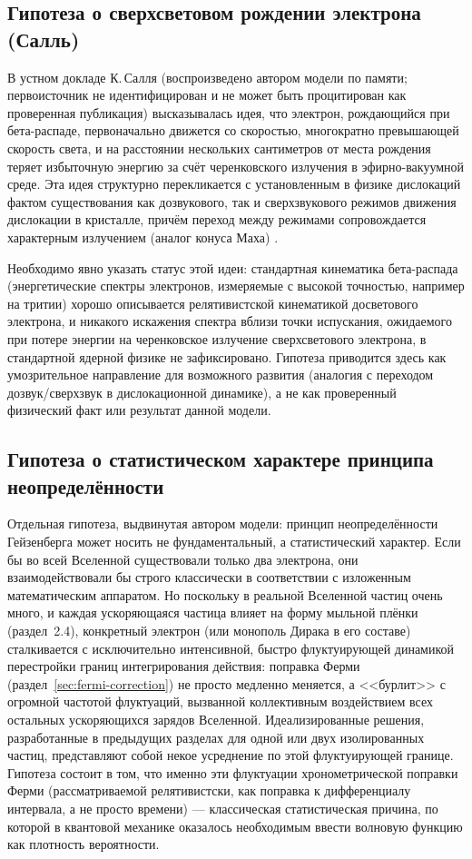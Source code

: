 \documentclass[12pt,a4paper]{article}
\begin{document}
\subsection{Гипотеза о сверхсветовом рождении электрона (Салль)}

В устном докладе К.\,Салля (воспроизведено автором модели по памяти;
первоисточник не идентифицирован и не может быть процитирован как
проверенная публикация) высказывалась идея, что электрон, рождающийся
при бета-распаде, первоначально движется со скоростью, многократно
превышающей скорость света, и на расстоянии нескольких сантиметров от
места рождения теряет избыточную энергию за счёт черенковского излучения
в эфирно-вакуумной среде. Эта идея структурно перекликается с
установленным в физике дислокаций фактом существования как дозвукового,
так и сверхзвукового режимов движения дислокации в кристалле, причём
переход между режимами сопровождается характерным излучением
(аналог конуса Маха) \cite{Lazar2010}.

Необходимо явно указать статус этой идеи: стандартная кинематика
бета-распада (энергетические спектры электронов, измеряемые с высокой
точностью, например на тритии) хорошо описывается релятивистской
кинематикой досветового электрона, и никакого искажения спектра вблизи
точки испускания, ожидаемого при потере энергии на черенковское
излучение сверхсветового электрона, в стандартной ядерной физике не
зафиксировано. Гипотеза приводится здесь как умозрительное направление
для возможного развития (аналогия с переходом дозвук/сверхзвук в
дислокационной динамике), а не как проверенный физический факт или
результат данной модели.

\subsection{Гипотеза о статистическом характере принципа неопределённости}

Отдельная гипотеза, выдвинутая автором модели: принцип неопределённости
Гейзенберга может носить не фундаментальный, а статистический характер.
Если бы во всей Вселенной существовали только два электрона, они
взаимодействовали бы строго классически в соответствии с изложенным
математическим аппаратом. Но поскольку в реальной Вселенной частиц
очень много, и каждая ускоряющаяся частица влияет на форму мыльной
плёнки (раздел~2.4), конкретный электрон (или монополь Дирака в его
составе) сталкивается с исключительно интенсивной, быстро флуктуирующей
динамикой перестройки границ интегрирования действия: поправка Ферми
(раздел~\ref{sec:fermi-correction}) не просто медленно меняется, а
<<бурлит>> с огромной частотой флуктуаций, вызванной коллективным
воздействием всех остальных ускоряющихся зарядов Вселенной. Идеализированные
решения, разработанные в предыдущих разделах для одной или двух изолированных
частиц, представляют собой некое усреднение по этой флуктуирующей границе.
Гипотеза состоит в том, что именно эти флуктуации хронометрической поправки
Ферми (рассматриваемой релятивистски, как поправка к дифференциалу
интервала, а не просто времени) --- классическая статистическая причина,
по которой в квантовой механике оказалось необходимым ввести волновую
функцию как плотность вероятности.
\end{document}
